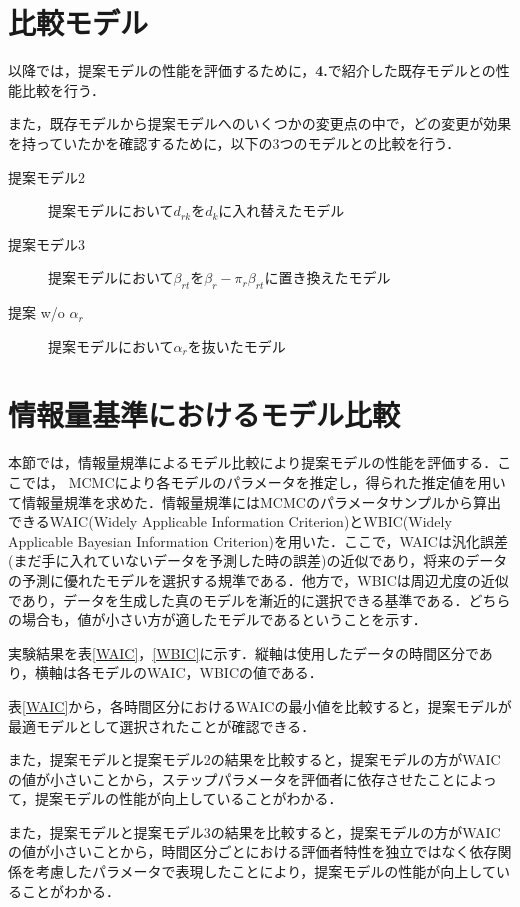 \documentclass[a4paper,11pt,oneside,openany]{jsbook}
\begin{document}
\newpage
\section{比較モデル}
以降では，提案モデルの性能を評価するために，\textbf{4.}で紹介した既存モデルとの性能比較を行う．

また，既存モデルから提案モデルへのいくつかの変更点の中で，どの変更が効果を持っていたかを確認するために，以下の3つのモデルとの比較を行う．

\begin{description}
\item [提案モデル2]提案モデルにおいて$d_{rk}$を$d_k$に入れ替えたモデル
\item[提案モデル3]提案モデルにおいて$\beta_{rt}$を$\beta_{r} - \pi_{r}\beta_{rt}$に置き換えたモデル
\item[提案 w/o $\alpha_r$]提案モデルにおいて$\alpha_r$を抜いたモデル
\end{description}

\section{情報量基準におけるモデル比較}

本節では，情報量規準によるモデル比較により提案モデルの性能を評価する．ここでは， MCMCにより各モデルのパラメータを推定し，得られた推定値を用いて情報量規準を求めた．情報量規準にはMCMCのパラメータサンプルから算出できるWAIC(Widely Applicable Information Criterion)とWBIC(Widely Applicable Bayesian Information Criterion)を用いた．ここで，WAICは汎化誤差(まだ手に入れていないデータを予測した時の誤差)の近似であり，将来のデータの予測に優れたモデルを選択する規準である．他方で，WBICは周辺尤度の近似であり，データを生成した真のモデルを漸近的に選択できる基準である．どちらの場合も，値が小さい方が適したモデルであるということを示す．

実験結果を表\ref{WAIC}，\ref{WBIC}に示す．縦軸は使用したデータの時間区分であり，横軸は各モデルのWAIC，WBICの値である．

表\ref{WAIC}から，各時間区分におけるWAICの最小値を比較すると，提案モデルが最適モデルとして選択されたことが確認できる．

また，提案モデルと提案モデル2の結果を比較すると，提案モデルの方がWAICの値が小さいことから，ステップパラメータを評価者に依存させたことによって，提案モデルの性能が向上していることがわかる．

また，提案モデルと提案モデル3の結果を比較すると，提案モデルの方がWAICの値が小さいことから，時間区分ごとにおける評価者特性を独立ではなく依存関係を考慮したパラメータで表現したことにより，提案モデルの性能が向上していることがわかる．
\end{document}
